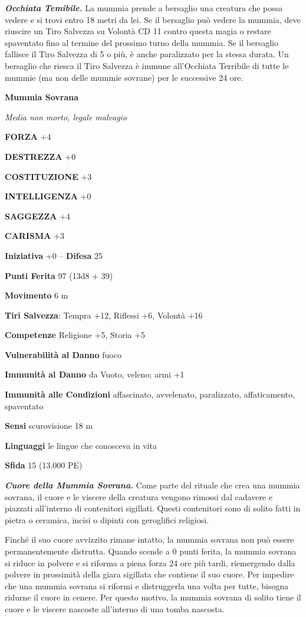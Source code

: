 \begin{multicols}{2}
\emph{\textbf{Occhiata Temibile.}} La mummia prende a bersaglio una creatura che possa vedere e si trovi entro 18 metri da lei. Se il bersaglio può vedere la mummia, deve riuscire un Tiro Salvezza su Volontà CD 11 contro questa magia o restare spaventato fino al termine del prossimo turno della mummia. Se il bersaglio fallisce il Tiro Salvezza di 5 o più, è anche paralizzato per la stessa durata. Un bersaglio che riesca il Tiro Salvezza è immune all'Occhiata Terribile di tutte le mummie (ma non delle mummie sovrane) per le successive 24 ore.

\medskip{}\textbf{Mummia Sovrana}

\emph{Media non morto, legale malvagio}

\textbf{FORZA} +4

\textbf{DESTREZZA} +0

\textbf{COSTITUZIONE} +3

\textbf{INTELLIGENZA} +0

\textbf{SAGGEZZA} +4

\textbf{CARISMA} +3

\textbf{Iniziativa} +0 -- \textbf{Difesa} 25

\textbf{Punti Ferita} 97 (13d8 + 39)

\textbf{Movimento} 6 m

\textbf{Tiri Salvezza}: Tempra +12, Riflessi +6, Volontà +16

\textbf{Competenze} Religione +5, Storia +5

\textbf{Vulnerabilità al Danno} fuoco

\textbf{Immunità al Danno} da Vuoto, veleno; armi +1

\textbf{Immunità alle Condizioni} affascinato, avvelenato, paralizzato, affaticamento, spaventato

\textbf{Sensi} scurovisione 18 m

\textbf{Linguaggi} le lingue che conosceva in vita

\textbf{Sfida} 15 (13.000 PE)

\emph{\textbf{Cuore della Mummia Sovrana.}} Come parte del rituale che crea una mummia sovrana, il cuore e le viscere della creatura vengono rimossi dal cadavere e piazzati all'interno di contenitori sigillati. Questi contenitori sono di solito fatti in pietra o ceramica, incisi o dipinti con geroglifici religiosi.

Finché il suo cuore avvizzito rimane intatto, la mummia sovrana non può essere permanentemente distrutta. Quando scende a 0 punti ferita, la mummia sovrana si riduce in polvere e si riforma a piena forza 24 ore più tardi, riemergendo dalla polvere in prossimità della giara sigillata che contiene il suo cuore. Per impedire che una mummia sovrana si riformi e distruggerla una volta per tutte, bisogna ridurne il cuore in cenere. Per questo motivo, la mummia sovrana di solito tiene il cuore e le viscere nascoste all'interno di una tomba nascosta.


\end{multicols}
